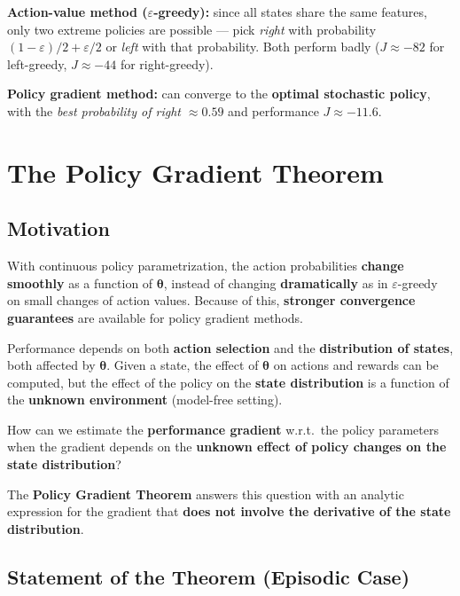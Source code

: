 \documentclass[11pt,a4paper]{article}
\theoremstyle{definition}
\theoremstyle{plain}
\theoremstyle{remark}
\begin{document}
\textbf{Action-value method ($\varepsilon$-greedy):} since all states share the same features, only two extreme policies are possible — pick \emph{right} with probability $(1-\varepsilon)/2 + \varepsilon/2$ or \emph{left} with that probability. Both perform badly ($J \approx -82$ for left-greedy, $J \approx -44$ for right-greedy).

\textbf{Policy gradient method:} can converge to the \textbf{optimal stochastic policy}, with the \emph{best probability of right $\approx 0.59$} and performance $J \approx -11.6$.

\section{The Policy Gradient Theorem}

\subsection{Motivation}

With continuous policy parametrization, the action probabilities \textbf{change smoothly} as a function of $\boldsymbol{\theta}$, instead of changing \textbf{dramatically} as in $\varepsilon$-greedy on small changes of action values. Because of this, \textbf{stronger convergence guarantees} are available for policy gradient methods.

Performance depends on both \textbf{action selection} and the \textbf{distribution of states}, both affected by $\boldsymbol{\theta}$. Given a state, the effect of $\boldsymbol{\theta}$ on actions and rewards can be computed, but the effect of the policy on the \textbf{state distribution} is a function of the \textbf{unknown environment} (model-free setting).

\begin{tcolorbox}[colback=red!5!white, colframe=red!70!black, title={Central Question}]
How can we estimate the \textbf{performance gradient} w.r.t.\ the policy parameters when the gradient depends on the \textbf{unknown effect of policy changes on the state distribution}?
\end{tcolorbox}

The \textbf{Policy Gradient Theorem} answers this question with an analytic expression for the gradient that \textbf{does not involve the derivative of the state distribution}.

\subsection{Statement of the Theorem (Episodic Case)}
\end{document}
